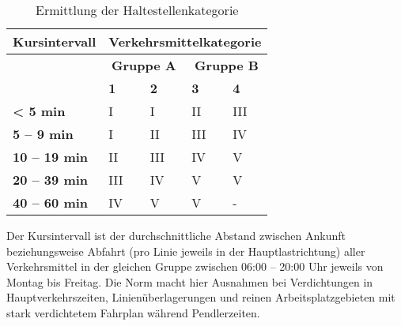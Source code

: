 \begin{table}[ht]
    \begin{tabular}[c]{l | p{2.9cm} p{2.9cm} | p{2.9cm} p{2.9cm}}
        \toprule
        \textbf{Kursintervall}
                                & \multicolumn{4}{c}{\textbf{Verkehrsmittelkategorie}}\\
        \midrule
        \textbf{}
                                & \multicolumn{2}{c|}{\textbf{Gruppe A}}
                                & \multicolumn{2}{c}{\textbf{Gruppe B}}\\
        \textbf{}
                                & \textbf{1}
                                & \textbf{2}
                                & \textbf{3}
                                & \textbf{4}\\
        \textbf{< 5 min}
                                & I
                                & I
                                & II
                                & III\\
        \textbf{5 -- 9 min}
                                & I
                                & II
                                & III
                                & IV\\
        \textbf{10 -- 19 min}
                                & II
                                & III
                                & IV
                                & V\\
        \textbf{20 -- 39 min}
                                & III
                                & IV
                                & V
                                & V\\
        \textbf{40 -- 60 min}
                                & IV
                                & V
                                & V
                                & -\\
        \bottomrule
    \end{tabular}
    \caption{Ermittlung der Haltestellenkategorie}
    \label{table:Ermittlung der Haltestellenkategorie}
\end{table}

Der Kursintervall ist der durchschnittliche Abstand zwischen Ankunft beziehungsweise Abfahrt (pro Linie jeweils in der Hauptlastrichtung) aller Verkehrsmittel in der gleichen Gruppe zwischen 06:00 -- 20:00 Uhr jeweils von Montag bis Freitag.
Die Norm macht hier Ausnahmen bei Verdichtungen in Hauptverkehrszeiten, Linienüberlagerungen und reinen Arbeitsplatzgebieten mit stark verdichtetem Fahrplan während Pendlerzeiten.

